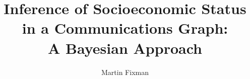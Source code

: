 \documentclass[runningheads, a4paper]{dalthesis/dalthesis}
\title{Inference of Socioeconomic Status \\ in a Communications Graph: \\ A Bayesian Approach}
\author{Martin Fixman}
\numberwithin{equation}{section}
\begin{document}
\frontmatter

\begin{abstract}
	
\end{abstract}

\mainmatter



















{}
\end{document}
